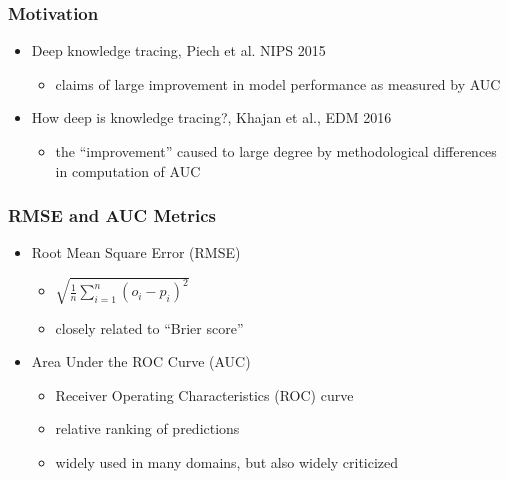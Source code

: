 \documentclass[bigger]{beamer}
\begin{document}
\begin{frame}
  \frametitle{Motivation}

  \begin{itemize}
  \item Deep knowledge tracing, Piech et al. NIPS 2015
    \begin{itemize}
    \item claims of large improvement in model performance as measured by AUC
    \end{itemize}
  \item How deep is knowledge tracing?, Khajan et al., EDM 2016
    \begin{itemize}
    \item the ``improvement'' caused to large degree by methodological
      differences in computation of AUC
    \end{itemize}
  \end{itemize}
\end{frame}

\begin{frame}
  \frametitle{RMSE and AUC Metrics}

  \begin{itemize}
  \item Root Mean Square Error (RMSE) 
    \begin{itemize}
    \item $\sqrt{\frac{1}{n} \sum_{i=1}^n (o_i - p_i)^2}$
    \item closely related to ``Brier score''
    \end{itemize}
  \item Area Under the ROC Curve (AUC)
    \begin{itemize}
    \item Receiver Operating Characteristics (ROC) curve
    \item relative ranking of predictions
    \item widely used in many domains, but also widely criticized
    \end{itemize}
  \end{itemize}
\end{frame}
\end{document}
